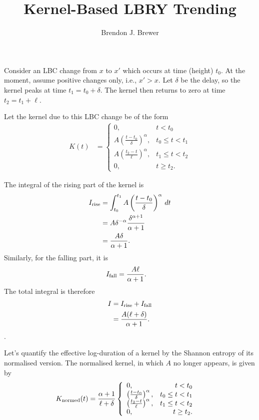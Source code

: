 \documentclass[a4paper, 12pt]{article}
\title{Kernel-Based LBRY Trending}
\author{Brendon J. Brewer}
\date{}
\begin{document}
\maketitle


\setlength{\parindent}{0pt}
\setlength{\parskip}{8pt}

Consider an LBC change from $x$ to $x'$ which occurs at time (height) $t_0$.
At the moment, assume positive changes only, i.e., $x' > x$.
Let $\delta$ be the delay, so the kernel peaks at time $t_1 = t_0 + \delta$.
The kernel then returns to zero at time $t_2 = t_1 + \ell$.

Let the kernel due to this LBC change be of the form
\begin{align}
K(t) &=
    \left\{
        \begin{array}{lr}
            0, & t < t_0 \\
            A\left(\frac{t - t_0}{\delta}\right)^\alpha, & t_0 \leq t < t_1 \\
            A\left(\frac{t_2 - t}{\ell}  \right)^\alpha, & t_1 \leq t < t_2 \\
            0, & t \geq t_2.
        \end{array}
    \right.
\end{align}

The integral of the rising part of the kernel is
\begin{align}
I_{\rm rise}
  &= \int_{t_0}^{t_1}A\left(\frac{t - t_0}{\delta}\right)^\alpha \, dt \\
  &= A\delta^{-\alpha}\frac{\delta^{\alpha+1}}{\alpha + 1} \\
  &= \frac{A\delta}{\alpha + 1}.
\end{align}
Similarly, for the falling part, it is
\begin{align}
I_{\rm fall}
  &= \frac{A\ell}{\alpha + 1}.
\end{align}
The total integral is therefore
\begin{align}
I &= I_{\rm rise} + I_{\rm fall} \\
  &= \frac{A(\ell + \delta)}{\alpha + 1}.
\end{align}.

Let's quantify the effective log-duration of a kernel by the Shannon entropy of
its normalised version. The normalised kernel, in which $A$ no longer appears,
is given by
\begin{align}
K_{\rm normed}(t) &=
    \frac{\alpha+1}{\ell+\delta}
    \left\{
        \begin{array}{lr}
            0, & t < t_0 \\
            \left(\frac{t - t_0}{\delta}\right)^\alpha, & t_0 \leq t < t_1 \\
            \left(\frac{t_2 - t}{\ell}  \right)^\alpha, & t_1 \leq t < t_2 \\
            0, & t \geq t_2.
        \end{array}
    \right.
\end{align}
\end{document}
